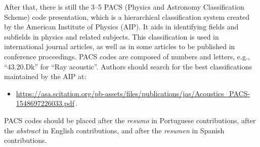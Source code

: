 \documentclass[12pt, a4paper, twoside, twocolumn]{article}
\begin{document}
After that, there is still the 3--5 PACS (Physics and Astronomy Classification Scheme) code presentation, which is a hierarchical classification system created by the American Institute of Physics (AIP). It aids in identifying fields and subfields in physics and related subjects. This classification is used in international journal articles, as well as in some articles to be published in conference proceedings. PACS codes are composed of numbers and letters, e.g., ``43.20.Dk'' for ``Ray acoustic''. 
Authors should search for the best classifications maintained by the AIP at:

\begin{itemize}[noitemsep,topsep=-1ex] \itemsep=8pt
	\item \url{https://asa.scitation.org/pb-assets/files/publications/jas/Acoustics_PACS-1548697226033.pdf}\,.
\end{itemize}
\vspace{0.25em}

PACS codes should be placed after the \textit{resumo} in Portuguese contributions, after the \textit{abstract} in English contributions, and after the \textit{resumen} in Spanish contributions.
\end{document}
